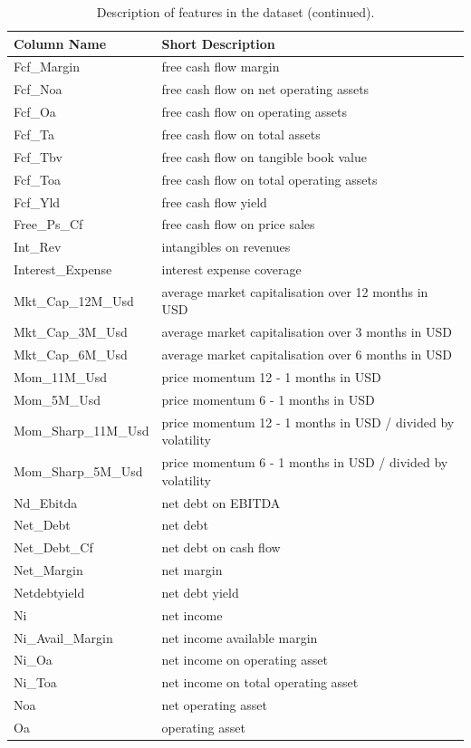 \documentclass[]{krantz}
\theoremstyle{definition}
\theoremstyle{definition}
\theoremstyle{definition}
\theoremstyle{remark}
\begin{document}
\begin{table}
\begin{center}
\begin{tabular}{l l}
\textbf{Column Name}    &   \textbf{Short Description}  \\ \hline
Fcf\_Margin &   free cash flow margin   \\
Fcf\_Noa    &   free cash flow on net operating assets  \\
Fcf\_Oa &   free cash flow on operating assets  \\
Fcf\_Ta &   free cash flow on total assets  \\
Fcf\_Tbv    &   free cash flow on tangible book value   \\
Fcf\_Toa    &   free cash flow on total operating assets    \\
Fcf\_Yld    &   free cash flow yield    \\
Free\_Ps\_Cf    &   free cash flow on price sales   \\
Int\_Rev    &   intangibles on revenues \\
Interest\_Expense   &   interest expense coverage   \\
Mkt\_Cap\_12M\_Usd  &   average market capitalisation over 12 months in USD \\
Mkt\_Cap\_3M\_Usd   &   average market capitalisation over 3 months in USD  \\
Mkt\_Cap\_6M\_Usd   &   average market capitalisation over 6 months in USD  \\
Mom\_11M\_Usd   &   price momentum  12 - 1 months in USD    \\
Mom\_5M\_Usd    &   price momentum  6 - 1 months in USD \\
Mom\_Sharp\_11M\_Usd    &   price momentum  12 - 1 months in USD / divided by volatility    \\ 
Mom\_Sharp\_5M\_Usd &   price momentum  6 - 1 months in USD / divided by volatility \\
Nd\_Ebitda  &   net debt on EBITDA  \\
Net\_Debt   &   net debt    \\
Net\_Debt\_Cf   &   net debt on cash flow   \\
Net\_Margin &   net margin  \\
Netdebtyield    &   net debt yield  \\
Ni  &   net income  \\
Ni\_Avail\_Margin   &   net income available margin \\
Ni\_Oa  &   net income on operating asset   \\
Ni\_Toa &   net income on total operating asset \\
Noa &   net operating asset \\
Oa  &   operating asset \\ \hline
\end{tabular}
\end{center}
\caption{Description of features in the dataset (continued). \label{tab:appendix2}}
\end{table}
\end{document}
